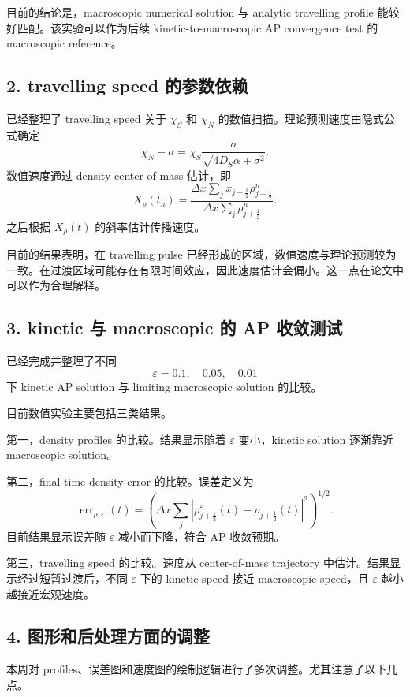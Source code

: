 \documentclass[11pt]{ctexart}
\begin{document}
目前的结论是，macroscopic numerical solution 与 analytic travelling profile 能较好匹配。该实验可以作为后续 kinetic-to-macroscopic AP convergence test 的 macroscopic reference。

\subsection*{2. travelling speed 的参数依赖}

已经整理了 travelling speed 关于 \(\chi_S\) 和 \(\chi_N\) 的数值扫描。理论预测速度由隐式公式确定
\[
\chi_N-\sigma
=
\chi_S
\frac{\sigma}{\sqrt{4D_S\alpha+\sigma^2}}.
\]
数值速度通过 density center of mass 估计，即
\[
X_\rho(t_n)
=
\frac{
\Delta x\sum_j x_{j+\frac12}\rho_{j+\frac12}^n
}{
\Delta x\sum_j \rho_{j+\frac12}^n
}.
\]
之后根据 \(X_\rho(t)\) 的斜率估计传播速度。

目前的结果表明，在 travelling pulse 已经形成的区域，数值速度与理论预测较为一致。在过渡区域可能存在有限时间效应，因此速度估计会偏小。这一点在论文中可以作为合理解释。

\subsection*{3. kinetic 与 macroscopic 的 AP 收敛测试}

已经完成并整理了不同
\[
\varepsilon=0.1,\quad 0.05,\quad 0.01
\]
下 kinetic AP solution 与 limiting macroscopic solution 的比较。

目前数值实验主要包括三类结果。

第一，density profiles 的比较。结果显示随着 \(\varepsilon\) 变小，kinetic solution 逐渐靠近 macroscopic solution。

第二，final-time density error 的比较。误差定义为
\[
\operatorname{err}_{\rho,\varepsilon}(t)
=
\left(
\Delta x\sum_j
\left|
\rho_{j+\frac12}^{\varepsilon}(t)
-
\rho_{j+\frac12}(t)
\right|^2
\right)^{1/2}.
\]
目前结果显示误差随 \(\varepsilon\) 减小而下降，符合 AP 收敛预期。

第三，travelling speed 的比较。速度从 center-of-mass trajectory 中估计。结果显示经过短暂过渡后，不同 \(\varepsilon\) 下的 kinetic speed 接近 macroscopic speed，且 \(\varepsilon\) 越小越接近宏观速度。

\subsection*{4. 图形和后处理方面的调整}

本周对 profiles、误差图和速度图的绘制逻辑进行了多次调整。尤其注意了以下几点。
\end{document}
